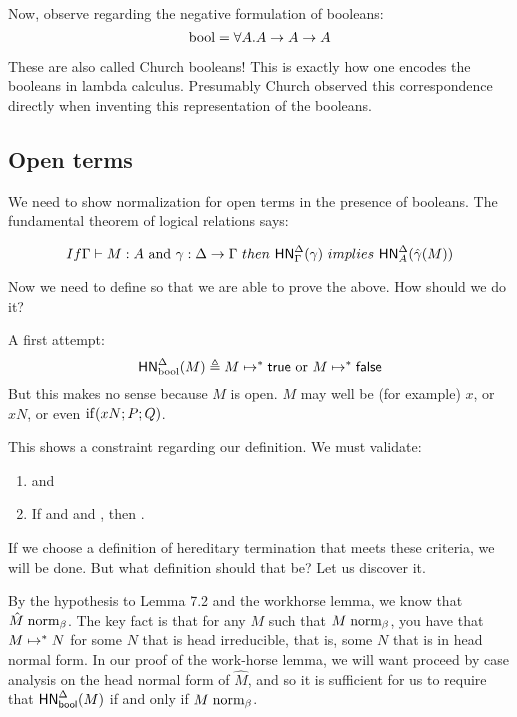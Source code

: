 \documentclass{article}
\begin{document}
Now, observe regarding the negative formulation of booleans:
\[
\text{bool} = \forall A . A \to A \to A
\]

These are also called Church booleans! This is exactly how one encodes the booleans in lambda calculus. Presumably Church observed this correspondence directly when inventing this representation of the booleans.

\subsection{Open terms}
We need to show normalization for open terms in the presence of booleans. The fundamental theorem of logical relations says:

\[
If \hasEF{\Gamma}{M}{A} \ \text{and} \ \gamma : \Delta \to \Gamma \ then \  \hnorm{\Delta}{\Gamma}{\gamma} \ implies \ \hnorm{\Delta}{A}{\hat\gamma(M)}
\]

Now we need to define  so that we are able to prove the above. How should we do it?

A first attempt:
\[
\mathsf{HN}^{\Delta}_{\text{bool}}(M) \triangleq M \mapsto^* \mathsf{true} \ \text{or} \ M \mapsto^* \mathsf{false}
\]
But this makes no sense because $M$ is open. $M$ may well be (for example) $x$, or $x N$, or even $\mathrm{if}(x N; P; Q)$.

This shows a constraint regarding our definition. We must validate:
\begin{lemma}
\leavevmode
\label{hn-bools}
\begin{enumerate}
\item \hnorm{\Delta}{\booltype}{\true} and \hnorm{\Delta}{\booltype}{\false}
\item If  and  and , then .
\end{enumerate}
\end{lemma}

If we choose a definition of hereditary termination that meets these criteria, we will be done. But what definition should that be? Let us discover it.

  By the hypothesis to Lemma 7.2 and the workhorse lemma, we know that
   $\hat M \mathrel{\text{norm}_\beta}$. The key fact is that for any $M$ such that $M \mathrel{\text{norm}_\beta}$,
   you have that $M \mapsto^* N$ for some $N$ that is head irreducible, that is,
   some $N$ that is in head normal form. In our proof of the work-horse lemma,
   we will want proceed by case analysis on the head normal form of $\hat M$,
   and so it is sufficient for us to require that $\mathsf{HN}^{\Delta}_{\mathsf{bool}}(M)$ if
   and only if $M \mathrel{\text{norm}_\beta}$.
\end{document}
